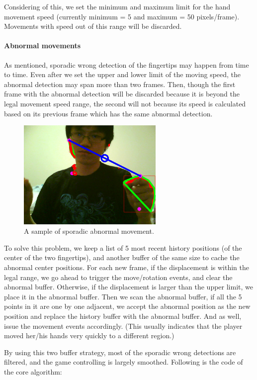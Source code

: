 \documentclass[10pt,twocolumn,letterpaper]{article}
\begin{document}
Considering of this, we set the minimum and maximum limit for the hand movement 
speed (currently minimum = 5 and maximum = 50 pixels/frame). Movements with speed 
out of this range will be discarded.

\paragraph{Abnormal movements}
As mentioned, sporadic wrong detection of the fingertips may happen from time 
to time. Even after we set the upper and lower limit of the moving speed, the 
abnormal detection may span more than two frames. Then, though the first frame with 
the abnormal detection will be discarded because it is beyond the legal movement 
speed range, the second will not because its speed is calculated based on its 
previous frame which has the same abnormal detection.

\begin{figure}[h]
\centering
\includegraphics[width=7cm]{abnormal.png}
\caption{A sample of sporadic abnormal movement.}
\label{fig:abnormal}
\end{figure}

To solve this problem, we keep a list of 5 most recent history positions 
(of the center of the two fingertips), and another buffer of the same size 
to cache the abnormal center positions.  For each new frame, if the displacement 
is within the legal range, we go ahead to trigger the move/rotation events, 
and clear the abnormal buffer. Otherwise, if the displacement is larger than 
the upper limit, we place it in the abnormal buffer. Then we scan the abnormal 
buffer, if all the 5 points in it are one by one adjacent, we accept the abnormal 
position as the new position and replace the history buffer with the abnormal 
buffer. And as well, issue the movement events accordingly. (This usually 
indicates that the player moved her/his hands very quickly to a different region.)

By using this two buffer strategy, most of the sporadic wrong detections are filtered, and the game controlling is largely smoothed. Following is the code of the core algorithm:
\end{document}
